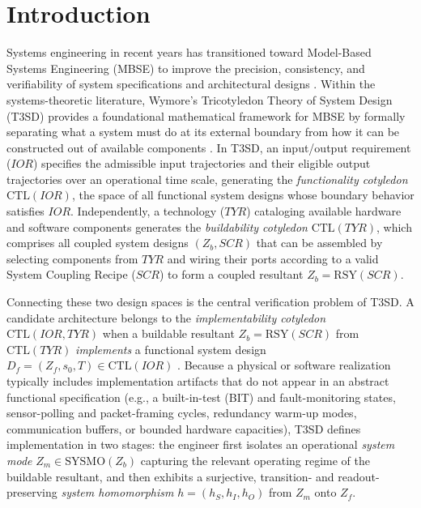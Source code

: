 \section{Introduction}
\label{sec:introduction}

Systems engineering in recent years has transitioned toward Model-Based Systems Engineering (MBSE) to improve the precision, consistency, and verifiability of system specifications and architectural designs \citep{salado2019mbse,INCOSE2023}. Within the systems-theoretic literature, Wymore's Tricotyledon Theory of System Design (T3SD) provides a foundational mathematical framework for MBSE by formally separating what a system must do at its external boundary from how it can be constructed out of available components \citep{Wymore1993,salado2019wymore}. In T3SD, an input/output requirement ($IOR$) specifies the admissible input trajectories and their eligible output trajectories over an operational time scale, generating the \emph{functionality cotyledon} $\mathrm{CTL}(IOR)$, the space of all functional system designs whose boundary behavior satisfies $IOR$. Independently, a technology ($TYR$) cataloging available hardware and software components generates the \emph{buildability cotyledon} $\mathrm{CTL}(TYR)$, which comprises all coupled system designs $(Z_b,SCR)$ that can be assembled by selecting components from $TYR$ and wiring their ports according to a valid System Coupling Recipe ($SCR$) to form a coupled resultant $Z_b=\mathrm{RSY}(SCR)$.

Connecting these two design spaces is the central verification problem of T3SD. A candidate architecture belongs to the \emph{implementability cotyledon} $\mathrm{CTL}(IOR,TYR)$ when a buildable resultant $Z_b=\mathrm{RSY}(SCR)$ from $\mathrm{CTL}(TYR)$ \emph{implements} a functional system design $D_f=(Z_f,s_0,T)\in\mathrm{CTL}(IOR)$ \citep{Wymore1993}. Because a physical or software realization typically includes implementation artifacts that do not appear in an abstract functional specification (e.g., a built-in-test (BIT) and fault-monitoring states, sensor-polling and packet-framing cycles, redundancy warm-up modes, communication buffers, or bounded hardware capacities), T3SD defines implementation in two stages: the engineer first isolates an operational \emph{system mode} $Z_m\in\mathrm{SYSMO}(Z_b)$ capturing the relevant operating regime of the buildable resultant, and then exhibits a surjective, transition- and readout-preserving \emph{system homomorphism} $h=(h_S,h_I,h_O)$ from $Z_m$ onto $Z_f$.

